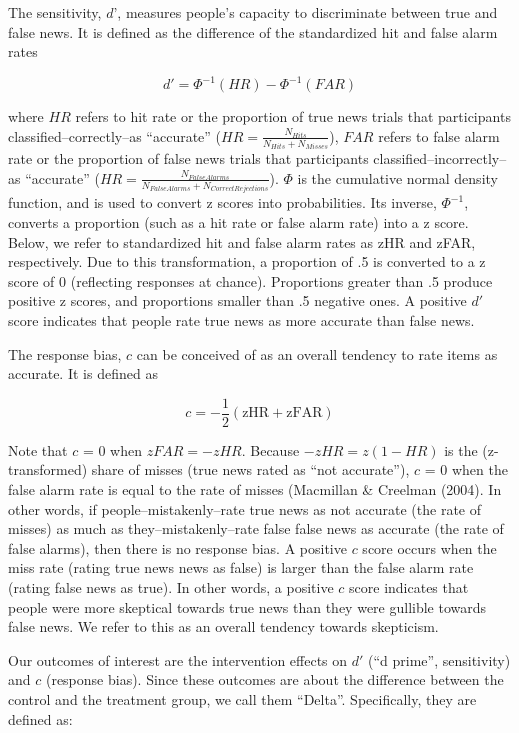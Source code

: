 \documentclass[
  man,mask,floatsintext]{apa6}
\begin{document}
The sensitivity, \(d’\), measures people's capacity to discriminate between true and false news. It is defined as the difference of the standardized hit and false alarm rates

\[
d' = \Phi^{-1}(HR) - \Phi^{-1}(FAR) 
\]

where \(HR\) refers to hit rate or the proportion of true news trials that participants classified--correctly--as ``accurate'' (\(HR = \frac{N_{Hits}}{N_{Hits} + N_{Misses}}\)), \(FAR\) refers to false alarm rate or the proportion of false news trials that participants classified--incorrectly--as ``accurate'' (\(HR = \frac{N_{False Alarms}}{N_{FalseAlarms} + N_{Correct Rejections}}\)). \(\Phi\) is the cumulative normal density function, and is used to convert z scores into probabilities. Its inverse, \(\Phi^{-1}\), converts a proportion (such as a hit rate or false alarm rate) into a z score. Below, we refer to standardized hit and false alarm rates as zHR and zFAR, respectively. Due to this transformation, a proportion of .5 is converted to a z score of 0 (reflecting responses at chance). Proportions greater than .5 produce positive z scores, and proportions smaller than .5 negative ones. A positive \(d'\) score indicates that people rate true news as more accurate than false news.

The response bias, \(c\) can be conceived of as an overall tendency to rate items as accurate. It is defined as

\[
c = -\frac{1}{2}(\text{zHR} + \text{zFAR})
\]

Note that \(c\) = 0 when \(zFAR = -zHR\). Because \(-zHR = z(1-HR)\) is the (z-transformed) share of misses (true news rated as ``not accurate''), \(c\) = 0 when the false alarm rate is equal to the rate of misses (Macmillan \& Creelman (2004). In other words, if people--mistakenly--rate true news as not accurate (the rate of misses) as much as they--mistakenly--rate false false news as accurate (the rate of false alarms), then there is no response bias. A positive \(c\) score occurs when the miss rate (rating true news news as false) is larger than the false alarm rate (rating false news as true). In other words, a positive \(c\) score indicates that people were more skeptical towards true news than they were gullible towards false news. We refer to this as an overall tendency towards skepticism.

Our outcomes of interest are the intervention effects on \(d'\) (``d prime'', sensitivity) and \(c\) (response bias). Since these outcomes are about the difference between the control and the treatment group, we call them ``Delta''. Specifically, they are defined as:
\end{document}
